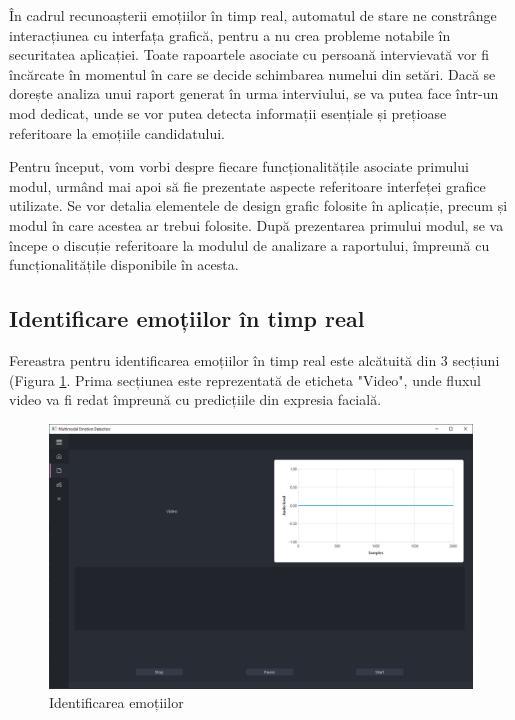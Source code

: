 \documentclass[a4paper, 12pt]{report}
\begin{document}
	În cadrul recunoașterii emoțiilor în timp real, automatul de stare ne constrânge interacțiunea cu interfața grafică, pentru a nu crea probleme notabile în securitatea aplicației. Toate rapoartele asociate cu persoană intervievată vor fi încărcate în momentul în care se decide schimbarea numelui din setări. Dacă se dorește analiza unui raport generat în urma interviului, se va putea face într-un mod dedicat, unde se vor putea detecta informații esențiale și prețioase referitoare la emoțiile candidatului.
	
	\bigskip
	Pentru început, vom vorbi despre fiecare funcționalitățile asociate primului modul, urmând mai apoi să fie prezentate aspecte referitoare interfeței grafice utilizate. Se vor detalia elementele de design grafic folosite în aplicație, precum și modul în care acestea ar trebui folosite. După prezentarea primului modul, se va începe o discuție referitoare la modulul de analizare a raportului, împreună cu funcționalitățile disponibile în acesta.
	
	\clearpage
	\subsection{Identificare emoțiilor în timp real}
	Fereastra pentru identificarea emoțiilor în timp real este alcătuită din 3 secțiuni (Figura \ref{fig:emotion_recog_clean}. Prima secțiunea este reprezentată de eticheta "Video", unde fluxul video va fi redat împreună cu predicțiile din expresia facială.
	
	\begin{figure}[H]
		\begin{center}
			\includegraphics[scale=0.4]{images/emotion_recognition_clean.png}
		\end{center}
		\caption{Identificarea emoțiilor}
		\label{fig:emotion_recog_clean}
	\end{figure} 
	
\end{document}
